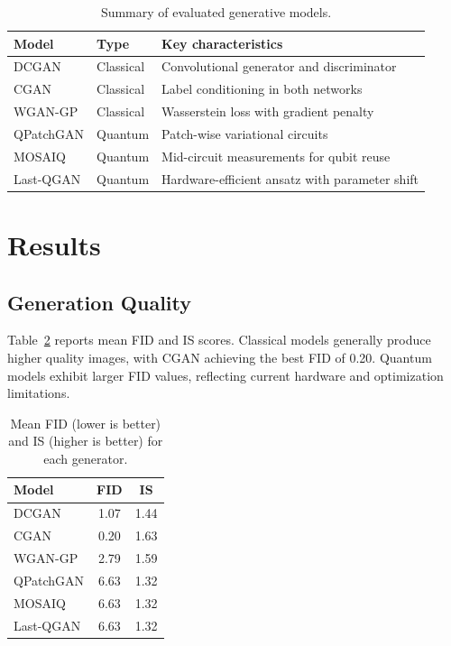 \documentclass[pdflatex,sn-mathphys-num]{sn-jnl}
\theoremstyle{thmstyleone}
\theoremstyle{thmstyletwo}
\theoremstyle{thmstylethree}
\begin{document}
\begin{table}[ht]
\caption{Summary of evaluated generative models.}
\centering
\begin{tabular}{lll}
\toprule
Model & Type & Key characteristics \\
\midrule
DCGAN & Classical & Convolutional generator and discriminator \\
CGAN & Classical & Label conditioning in both networks \\
WGAN-GP & Classical & Wasserstein loss with gradient penalty \\
QPatchGAN & Quantum & Patch-wise variational circuits \\
MOSAIQ & Quantum & Mid-circuit measurements for qubit reuse \\
Last-QGAN & Quantum & Hardware-efficient ansatz with parameter shift \\
\bottomrule
\end{tabular}
\label{tab:models}
\end{table}

\section{Results}\label{sec:results}
\subsection{Generation Quality}
Table~\ref{tab:fid} reports mean FID and IS scores. Classical models generally produce higher quality images, with CGAN achieving the best FID of 0.20. Quantum models exhibit larger FID values, reflecting current hardware and optimization limitations.

\begin{table}[ht]
\caption{Mean FID (lower is better) and IS (higher is better) for each generator.}
\centering
\begin{tabular}{lcc}
\toprule
Model & FID & IS \\
\midrule
DCGAN & 1.07 & 1.44 \\
CGAN & 0.20 & 1.63 \\
WGAN-GP & 2.79 & 1.59 \\
QPatchGAN & 6.63 & 1.32 \\
MOSAIQ & 6.63 & 1.32 \\
Last-QGAN & 6.63 & 1.32 \\
\bottomrule
\end{tabular}
\label{tab:fid}
\end{table}
\end{document}
